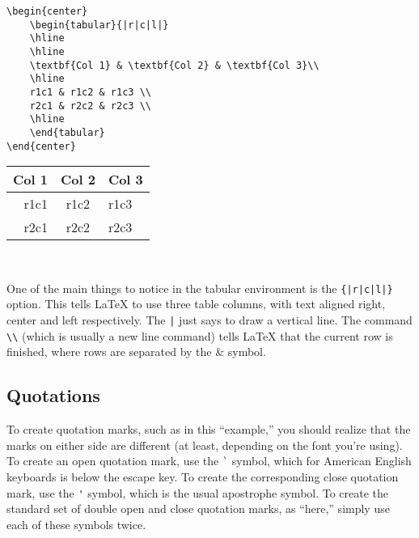 \documentclass[letterpaper,twoside,10pt]{article}
\begin{document}
\begin{multicols}{2}
{\small\begin{verbatim}
\begin{center}
    \begin{tabular}{|r|c|l|}
    \hline
    \hline
    \textbf{Col 1} & \textbf{Col 2} & \textbf{Col 3}\\
    \hline
    r1c1 & r1c2 & r1c3 \\
    r2c1 & r2c2 & r2c3 \\
    \hline
    \end{tabular}
\end{center}
\end{verbatim}}

\begin{center}
    \begin{tabular}{|r|c|l|}
    \hline
    \hline
    \textbf{Col 1} & \textbf{Col 2} & \textbf{Col 3}\\
    \hline
    r1c1 & r1c2 & r1c3 \\
    r2c1 & r2c2 & r2c3 \\
    \hline
    \end{tabular}
\end{center}

\vspace{4pc}~
\end{multicols}

One of the main things to notice in the tabular environment is the \verb!{|r|c|l|}! option. This
tells {\LaTeX} to use three table columns, with text aligned right, center and left respectively.
The \verb!|! just says to draw a vertical line. The command \verb!\\! (which is usually a new line
command) tells {\LaTeX} that the current row is finished, where rows are separated by the \& symbol.


\subsection{Quotations} 

To create quotation marks, such as in this ``example,'' you should realize that the marks on either
side are different (at least, depending on the font you're using). To create an open quotation mark,
use the \verb!`! symbol, which for American English keyboards is below the escape key. To create the
corresponding close quotation mark, use the \verb!'! symbol, which is the usual apostrophe symbol.
To create the standard set of double open and close quotation marks, as ``here,'' simply use each of
these symbols twice.
\end{document}

